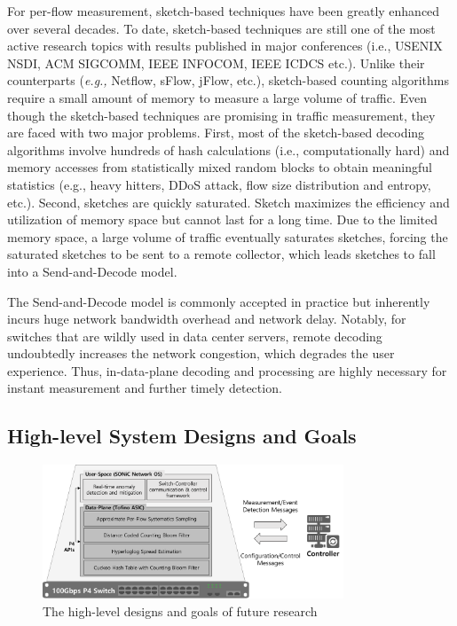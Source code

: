 \documentclass{NSF}
\newcommand{\etc}{{etc.}\xspace}
\newcommand{\eg}{{\em e.g.,}\xspace}
\begin{document}
For per-flow measurement, sketch-based techniques have been greatly enhanced over several decades. To date, sketch-based techniques are still one of the most active research topics with results published in major conferences (i.e., USENIX NSDI, ACM SIGCOMM, IEEE INFOCOM, IEEE ICDCS \etc). Unlike their counterparts (\eg Netflow, sFlow, jFlow, \etc), sketch-based counting algorithms require a small amount of memory to measure a large volume of traffic.%
Even though the sketch-based techniques are promising in traffic measurement, they are faced with two major problems. First, most of the sketch-based decoding algorithms involve hundreds of hash calculations (i.e., computationally hard) and memory accesses from statistically mixed random blocks to obtain meaningful statistics (e.g., heavy hitters, DDoS attack, flow size distribution and entropy, etc.). Second, sketches are quickly saturated. Sketch maximizes the efficiency and utilization of memory space but cannot last for a long time. Due to the limited memory space, a large volume of traffic eventually saturates sketches, forcing the saturated sketches to be sent to a remote collector, which leads sketches to fall into a Send-and-Decode model.

The Send-and-Decode model is commonly accepted in practice but inherently incurs huge network bandwidth overhead and network delay. Notably, for switches that are wildly used in data center servers, remote decoding undoubtedly increases the network congestion, which degrades the user experience. Thus, in-data-plane decoding and processing are highly necessary for instant measurement and further timely detection.

\subsection{High-level System Designs and Goals}
\begin{figure}[b]
  \centering
  \includegraphics[width=0.8\textwidth]{fig/Vision.png} 
  \caption{The high-level designs and goals of future research}
\end{figure}
\end{document}
